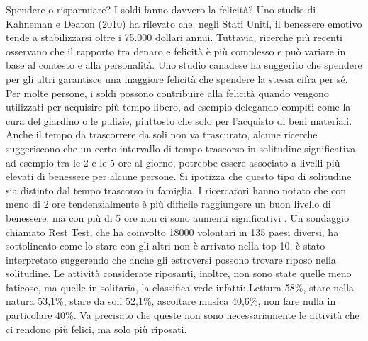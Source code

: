 \documentclass[12pt]{book} %
\begin{document}
\begin{mdframed}[linewidth=1pt]
Spendere o risparmiare? I soldi fanno davvero la felicità? Uno studio di Kahneman e Deaton (2010) ha rilevato che, negli Stati Uniti, il benessere emotivo tende a stabilizzarsi oltre i 75.000 dollari annui. Tuttavia, ricerche più recenti osservano che il rapporto tra denaro e felicità è più complesso e può variare in base al contesto e alla personalità. Uno studio canadese ha suggerito che spendere per gli altri
garantisce una maggiore felicità che spendere la stessa cifra per sé. 
Per molte persone, i soldi possono contribuire alla felicità quando vengono utilizzati per acquisire più tempo libero, ad esempio delegando compiti come la cura del giardino o le pulizie, piuttosto che solo per l'acquisto di beni materiali. Anche il tempo da trascorrere da soli non va
trascurato, alcune ricerche suggeriscono che un certo intervallo di tempo trascorso in solitudine significativa, ad esempio tra le 2 e le 5 ore al giorno, potrebbe essere associato a livelli più elevati di benessere per alcune persone. Si ipotizza che questo tipo di solitudine sia distinto dal tempo trascorso in famiglia. I ricercatori hanno notato che con meno di 2 ore tendenzialmente è più difficile raggiungere un buon livello di benessere, ma con più di 5 ore non ci sono aumenti significativi
  .
Un sondaggio chiamato Rest Test, che ha coinvolto 18000 volontari in 135 paesi diversi, ha sottolineato come lo stare con gli altri non è arrivato nella top 10, è stato interpretato suggerendo che anche gli estroversi possono trovare riposo nella solitudine. Le attività considerate riposanti, inoltre, non sono state quelle meno faticose, ma quelle in solitaria, la classifica vede infatti: Lettura 58\%, stare nella natura 53,1\%, stare da soli 52,1\%, ascoltare musica 40,6\%, non fare nulla in particolare 40\%. Va precisato che queste non sono necessariamente le attività che ci rendono più felici, ma solo più riposati.


\end{mdframed}
\end{document}
